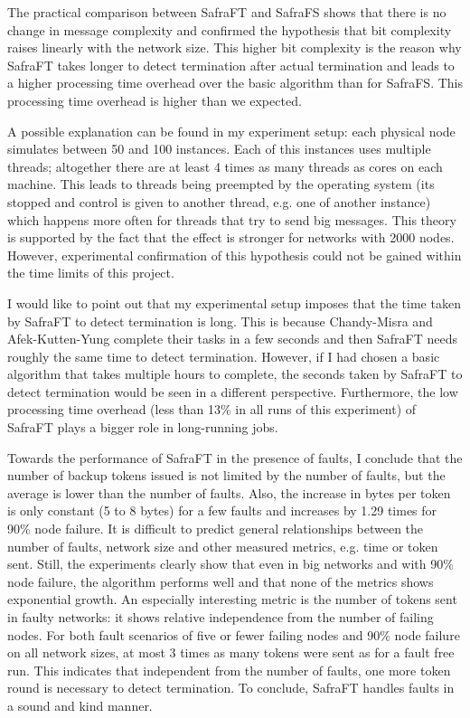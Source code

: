 The practical comparison between SafraFT and SafraFS shows that there is no change in message complexity and confirmed the hypothesis that bit complexity raises linearly with the network size.
This higher bit complexity is the reason why SafraFT takes longer to detect termination after actual termination and leads to a higher processing time overhead over the basic algorithm than for SafraFS.
This processing time overhead is higher than we expected.

A possible explanation can be found in my experiment setup: each physical node simulates between 50 and 100 instances.
Each of this instances uses multiple threads; altogether there are at least 4 times as many threads as cores on each machine.
This leads to threads being preempted by the operating system (its stopped and control is given to another thread, e.g. one of another instance) which happens more often for threads that try to send big messages.
This theory is supported by the fact that the effect is stronger for networks with 2000 nodes.
However, experimental confirmation of this hypothesis could not be gained within the time limits of this project.

I would like to point out that my experimental setup imposes that the time taken by SafraFT to detect termination is long.
This is because Chandy-Misra and Afek-Kutten-Yung complete their tasks in a few seconds and then SafraFT needs roughly the same time to detect termination.
However, if I had chosen a basic algorithm that takes multiple hours to complete, the seconds taken by SafraFT to detect termination would be seen in a different perspective.
Furthermore, the low processing time overhead (less than 13\% in all runs of this experiment)  %
of SafraFT plays a bigger role in long-running jobs.

Towards the performance of SafraFT in the presence of faults, I conclude that the number of backup tokens issued is not limited by the number of faults, but the average is lower than the number of faults.
Also, the increase in bytes per token is only constant (5 to 8 bytes) for a few faults and increases by 1.29 times for 90\% node failure.  %
It is difficult to predict general relationships between the number of faults, network size and other measured metrics, e.g. time or token sent.
Still, the experiments clearly show that even in big networks and with 90\% node failure, the algorithm performs well and that none of the metrics shows exponential growth.
An especially interesting metric is the number of tokens sent in faulty networks: it shows relative independence from the number of failing nodes.
For both fault scenarios of five or fewer failing nodes and 90\% node failure on all network sizes, at most 3 times as many tokens were sent as for a fault free run. %
This indicates that independent from the number of faults, one more token round is necessary to detect termination.
To conclude, SafraFT handles faults in a sound and kind manner.

